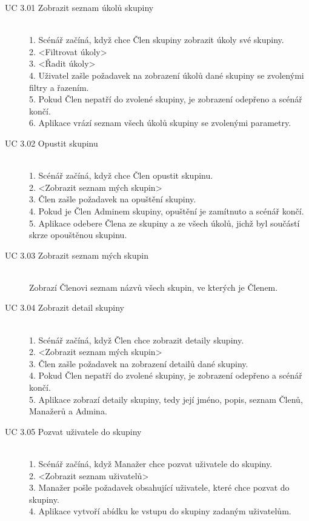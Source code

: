 \documentclass[thesis=B,czech]{FITthesis}[2012/06/26]
\begin{document}
			\begin{description}
				\item[UC 3.01 Zobrazit seznam úkolů skupiny] \hfill \\
					1. Scénář začíná, když chce Člen skupiny zobrazit úkoly své skupiny. \\
					2. <Filtrovat úkoly> \\
					3. <Řadit úkoly> \\
					4. Uživatel zašle požadavek na zobrazení úkolů dané skupiny se zvolenými filtry a řazením. \\
					5. Pokud Člen nepatří do zvolené skupiny, je zobrazení odepřeno a scénář končí. \\
					6. Aplikace vrází seznam všech úkolů skupiny se zvolenými parametry. \\
					
				\item[UC 3.02 Opustit skupinu] \hfill \\
					1. Scénář začíná, když chce Člen opustit skupinu. \\
					2. <Zobrazit seznam mých skupin> \\
					3. Člen zašle požadavek na opuštění skupiny. \\
					4. Pokud je Člen Adminem skupiny, opuštění je zamítnuto a scénář končí. \\
					5. Aplikace odebere Člena ze skupiny a ze všech úkolů, jichž byl součástí skrze opouštěnou skupinu.
				
				\item[UC 3.03 Zobrazit seznam mých skupin] \hfill \\
					Zobrazí Členovi seznam názvů všech skupin, ve kterých je Členem.
				
				\item[UC 3.04 Zobrazit detail skupiny] \hfill \\
					1. Scénář začíná, když Člen chce zobrazit detaily skupiny. \\
					2. <Zobrazit seznam mých skupin> \\
					3. Člen zašle požadavek na zobrazení detailů dané skupiny. \\
					4. Pokud Člen nepatří do zvolené skupiny, je zobrazení odepřeno a scénář končí. \\
					5. Aplikace zobrazí detaily skupiny, tedy její jméno, popis, seznam Členů, Manažerů a Admina.
				
				\item[UC 3.05 Pozvat uživatele do skupiny] \hfill \\
					1. Scénář začíná, když Manažer chce pozvat uživatele do skupiny. \\
					2. <Zobrazit seznam uživatelů> \\
					3. Manažer pošle požadavek obsahující uživatele, které chce pozvat do skupiny. \\
					4. Aplikace vytvoří abídku ke vstupu do skupiny zadaným uživatelům. \\
				

\end{description}
\end{document}

